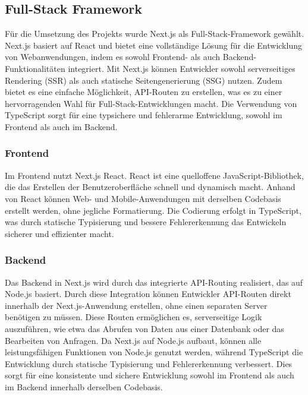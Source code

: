 \documentclass[a4paper,12pt]{article}
\begin{document}

\subsection{Full-Stack Framework}
Für die Umsetzung des Projekts wurde \gls{Next.js} als Full-Stack-Framework gewählt. Next.js basiert auf \gls{React} und bietet eine vollständige Lösung für die Entwicklung von Webanwendungen, indem es sowohl Frontend- als auch Backend-Funktionalitäten integriert. Mit Next.js können Entwickler sowohl serverseitiges Rendering (SSR) als auch statische Seitengenerierung (SSG) nutzen. Zudem bietet es eine einfache Möglichkeit, API-Routen zu erstellen, was es zu einer hervorragenden Wahl für Full-Stack-Entwicklungen macht. Die Verwendung von \gls{TypeScript} sorgt für eine typsichere und fehlerarme Entwicklung, sowohl im \gls{Frontend} als auch im Backend.


\subsubsection{Frontend}
Im Frontend nutzt Next.js React. React ist eine quelloffene JavaScript-Bibliothek, die das Erstellen der Benutzeroberfläche schnell und dynamisch macht. Anhand von React können Web- und Mobile-Anwendungen mit derselben Codebasis erstellt werden, ohne jegliche Formatierung. Die Codierung erfolgt in TypeScript, was durch statische Typisierung und bessere Fehlererkennung das Entwickeln sicherer und effizienter macht.


\subsubsection{Backend}
Das \gls{Backend} in Next.js wird durch das integrierte API-Routing realisiert, das auf Node.js basiert. Durch diese Integration können Entwickler API-Routen direkt innerhalb der Next.js-Anwendung erstellen, ohne einen separaten Server benötigen zu müssen. Diese Routen ermöglichen es, serverseitige Logik auszuführen, wie etwa das Abrufen von Daten aus einer Datenbank oder das Bearbeiten von Anfragen. Da Next.js auf Node.js aufbaut, können alle leistungsfähigen Funktionen von Node.js genutzt werden, während TypeScript die Entwicklung durch statische Typisierung und Fehlererkennung verbessert. Dies sorgt für eine konsistente und sichere Entwicklung sowohl im Frontend als auch im Backend innerhalb derselben Codebasis.
\end{document}
